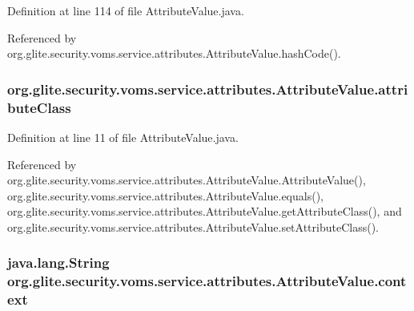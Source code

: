 Definition at line 114 of file AttributeValue.java.



Referenced by org.glite.security.voms.service.attributes.AttributeValue.hashCode().

\hypertarget{classorg_1_1glite_1_1security_1_1voms_1_1service_1_1attributes_1_1AttributeValue_a1cbf215d1cf7105a3680f39d81a8a6c5}{
\subsubsection[{attributeClass}]{ {\bf org.glite.security.voms.service.attributes.AttributeValue.attributeClass}}}
\label{classorg_1_1glite_1_1security_1_1voms_1_1service_1_1attributes_1_1AttributeValue_a1cbf215d1cf7105a3680f39d81a8a6c5}


Definition at line 11 of file AttributeValue.java.



Referenced by org.glite.security.voms.service.attributes.AttributeValue.AttributeValue(), org.glite.security.voms.service.attributes.AttributeValue.equals(), org.glite.security.voms.service.attributes.AttributeValue.getAttributeClass(), and org.glite.security.voms.service.attributes.AttributeValue.setAttributeClass().

\hypertarget{classorg_1_1glite_1_1security_1_1voms_1_1service_1_1attributes_1_1AttributeValue_acfb2dbac22d0f61179a66e37178845fd}{
\subsubsection[{context}]{\setlength{\rightskip}{0pt plus 5cm}java.lang.String {\bf org.glite.security.voms.service.attributes.AttributeValue.context}}}
\label{classorg_1_1glite_1_1security_1_1voms_1_1service_1_1attributes_1_1AttributeValue_acfb2dbac22d0f61179a66e37178845fd}


